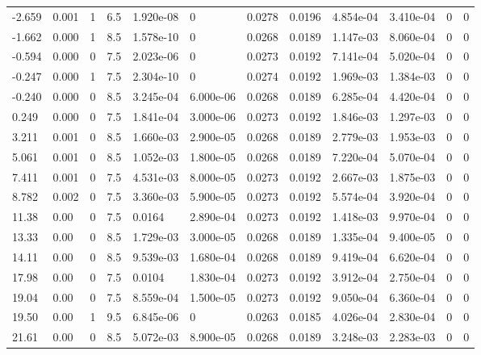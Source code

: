 \documentclass[preview]{standalone}
\begin{document}
{{\begin{tabular}{L{1.2cm}C{1.2cm} C{0.3cm}C{0.5cm} C{1.4cm}C{1.4cm} C{1.4cm}C{1.4cm} C{1.6cm}C{1.6cm} C{1.6cm}C{1.6cm}}
  -2.659  &  0.001  & 1     & 6.5 &  1.920e-08  & 0  &  0.0278&   0.0196& 4.854e-04 & 3.410e-04   &  0 & 0  \\ 
  -1.662  &  0.000  & 1     & 8.5 &  1.578e-10  & 0  &  0.0268&   0.0189& 1.147e-03 & 8.060e-04   &  0 & 0  \\ 
  -0.594  &  0.000  & 0     & 7.5 &  2.023e-06  & 0  &  0.0273&   0.0192& 7.141e-04 & 5.020e-04   &  0 & 0  \\ 
  -0.247  &  0.000  & 1     & 7.5 &  2.304e-10  & 0  &  0.0274&   0.0192& 1.969e-03 & 1.384e-03   &  0 & 0  \\ 
  -0.240  &  0.000  & 0     & 8.5 &  3.245e-04  & 6.000e-06  &  0.0268&   0.0189& 6.285e-04 & 4.420e-04   &  0 & 0  \\ 
  0.249  &  0.000  & 0     & 7.5 &  1.841e-04  & 3.000e-06  &  0.0273&   0.0192& 1.846e-03 & 1.297e-03   &  0 & 0  \\ 
  3.211  &  0.001  & 0     & 8.5 &  1.660e-03  & 2.900e-05  &  0.0268&   0.0189& 2.779e-03 & 1.953e-03   &  0 & 0  \\ 
  5.061  &  0.001  & 0     & 8.5 &  1.052e-03  & 1.800e-05  &  0.0268&   0.0189& 7.220e-04 & 5.070e-04   &  0 & 0  \\ 
  7.411  &  0.001  & 0     & 7.5 &  4.531e-03  & 8.000e-05  &  0.0273&   0.0192& 2.667e-03 & 1.875e-03   &  0 & 0  \\ 
  8.782  &  0.002  & 0     & 7.5 &  3.360e-03  & 5.900e-05  &  0.0273&   0.0192& 5.574e-04 & 3.920e-04   &  0 & 0  \\ 
  11.38  &  0.00  & 0     & 7.5 &  0.0164  & 2.890e-04  &  0.0273&   0.0192& 1.418e-03 & 9.970e-04   &  0 & 0  \\ 
  13.33  &  0.00  & 0     & 8.5 &  1.729e-03  & 3.000e-05  &  0.0268&   0.0189& 1.335e-04 & 9.400e-05   &  0 & 0  \\ 
  14.11  &  0.00  & 0     & 8.5 &  9.539e-03  & 1.680e-04  &  0.0268&   0.0189& 9.419e-04 & 6.620e-04   &  0 & 0  \\ 
  17.98  &  0.00  & 0     & 7.5 &  0.0104  & 1.830e-04  &  0.0273&   0.0192& 3.912e-04 & 2.750e-04   &  0 & 0  \\ 
  19.04  &  0.00  & 0     & 7.5 &  8.559e-04  & 1.500e-05  &  0.0273&   0.0192& 9.050e-04 & 6.360e-04   &  0 & 0  \\ 
  19.50  &  0.00  & 1     & 9.5 &  6.845e-06  & 0  &  0.0263&   0.0185& 4.026e-04 & 2.830e-04   &  0 & 0  \\ 
  21.61  &  0.00  & 0     & 8.5 &  5.072e-03  & 8.900e-05  &  0.0268&   0.0189& 3.248e-03 & 2.283e-03   &  0 & 0  \\ 

\end{tabular}}}
\end{document}
